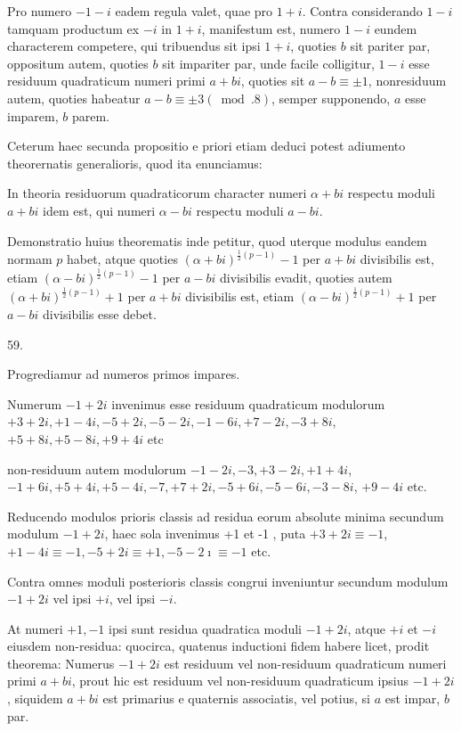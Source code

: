 \documentclass[10pt]{article}
\begin{document}
Pro numero \(-1-i\) eadem regula valet, quae pro \(1+i\). Contra considerando \(1-i\) tamquam productum ex \(-i\) in \(1+i\), manifestum est, numero \(1-i\) eundem characterem competere, qui tribuendus sit ipsi \(1+i\), quoties \(b\) sit pariter par, oppositum autem, quoties \(b\) sit impariter par, unde facile colligitur, \(1-i\) esse residuum quadraticum numeri primi \(a+b i\), quoties sit \(a-b \equiv \pm 1\), nonresiduum autem, quoties habeatur \(a-b \equiv \pm 3(\bmod .8)\), semper supponendo, \(a\) esse imparem, \(b\) parem.

Ceterum haec secunda propositio e priori etiam deduci potest adiumento theorernatis generalioris, quod ita enunciamus:

In theoria residuorum quadraticorum character numeri \(\alpha+b i\) respectu moduli \(a+b i\) idem est, qui numeri \(\alpha-b i\) respectu moduli \(a-b i\).

Demonstratio huius theorematis inde petitur, quod uterque modulus eandem normam \(p\) habet, atque quoties \((\alpha+b i)^{\frac{1}{2}(p-1)}-1\) per \(a+b i\) divisibilis est, etiam \((\alpha-b i)^{\frac{1}{2}(p-1)}-1\) per \(a-b i\) divisibilis evadit, quoties autem \((\alpha+b i)^{\frac{1}{2}(p-1)}+1\) per \(a+b i\) divisibilis est, etiam \((\alpha-b i)^{\frac{1}{2}(p-1)}+1\) per \(a-b i\) divisibilis esse debet.

59.

Progrediamur ad numeros primos impares.

Numerum \(-1+2 i\) invenimus esse residuum quadraticum modulorum \(+3+2 i,+1-4 i,-5+2 i,-5-2 i,-1-6 i,+7-2 i,-3+8 i\), \(+5+8 i,+5-8 i,+9+4 i\) etc

non-residuum autem modulorum \(-1-2 i,-3,+3-2 i,+1+4 i\), \(-1+6 i,+5+4 i,+5-4 i,-7,+7+2 i,-5+6 i,-5-6 i,-3-8 i\), \(+9-4 i\) etc.

Reducendo modulos prioris classis ad residua eorum absolute minima secundum modulum \(-1+2 i\), haec sola invenimus +1 et -1 , puta \(+3+2 i \equiv-1\), \(+1-4 i \equiv-1,-5+2 i \equiv+1,-5-2 \imath \equiv-1\) etc.

Contra omnes moduli posterioris classis congrui inveniuntur secundum modulum \(-1+2 i\) vel ipsi \(+i\), vel ipsi \(-i\).

At numeri \(+1,-1\) ipsi sunt residua quadratica moduli \(-1+2 i\), atque \(+i\) et \(-i\) eiusdem non-residua: quocirca, quatenus inductioni fidem habere licet, prodit theorema: Numerus \(-1+2 i\) est residuum vel non-residuum quadraticum numeri primi \(a+b i\), prout hic est residuum vel non-residuum quadraticum ipsius \(-1+2 i\), siquidem \(a+b i\) est primarius e quaternis associatis, vel potius, si \(a\) est impar, \(b\) par.
\end{document}
